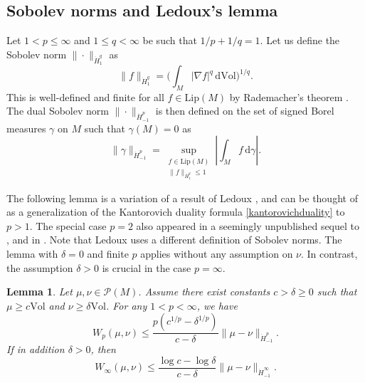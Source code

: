 \documentclass[11pt,a4paper]{article}
\newtheorem{lem}[thm]{Lemma}
\theoremstyle{definition}
\begin{document}
\subsection{Sobolev norms and Ledoux's lemma}

Let $1< p \le \infty$ and $1 \le q < \infty$ be such that $1/p+1/q=1$. Let us define the Sobolev norm $\| \cdot \|_{\dot{H}_1^q}$ as
\[ \| f \|_{\dot{H}_1^q} = \bigg( \int_M |\nabla f|^q \, \mathrm{d} \mathrm{Vol} \bigg)^{1/q} . \]
This is well-defined and finite for all $f \in \mathrm{Lip}(M)$ by Rademacher's theorem \cite[p.\ 234]{VI}. The dual Sobolev norm $\| \cdot \|_{\dot{H}_{-1}^p}$ is then defined on the set of signed Borel measures $\gamma$ on $M$ such that $\gamma(M)=0$ as
\begin{equation}\label{dualsobolevnorm}
\| \gamma \|_{\dot{H}_{-1}^p} = \sup_{\substack{f \in \mathrm{Lip}(M) \\ \| f \|_{\dot{H}_1^q} \le 1}} \left| \int_M f \, \mathrm{d}\gamma \right| .
\end{equation}

The following lemma is a variation of a result of Ledoux \cite[Theorem 2]{LE1}, and can be thought of as a generalization of the Kantorovich duality formula \eqref{kantorovichduality} to $p>1$. The special case $p=2$ also appeared in a seemingly unpublished sequel to \cite{LE1}, and in \cite{PEY}. Note that Ledoux uses a different definition of Sobolev norms. The lemma with $\delta=0$ and finite $p$ applies without any assumption on $\nu$. In contrast, the assumption $\delta>0$ is crucial in the case $p=\infty$.
\begin{lem}\label{ledouxlemma} Let $\mu, \nu \in \mathcal{P}(M)$. Assume there exist constants $c>\delta \ge 0$ such that $\mu \ge c \mathrm{Vol}$ and $\nu \ge \delta \mathrm{Vol}$. For any $1<p<\infty$, we have
\[ W_p (\mu, \nu) \le \frac{p(c^{1/p} - \delta^{1/p})}{c-\delta} \| \mu - \nu \|_{\dot{H}_{-1}^p} .  \]
If in addition $\delta>0$, then
\[ W_{\infty} (\mu, \nu) \le \frac{\log c - \log \delta}{c-\delta} \| \mu - \nu \|_{\dot{H}_{-1}^{\infty}} . \]
\end{lem}
\end{document}
